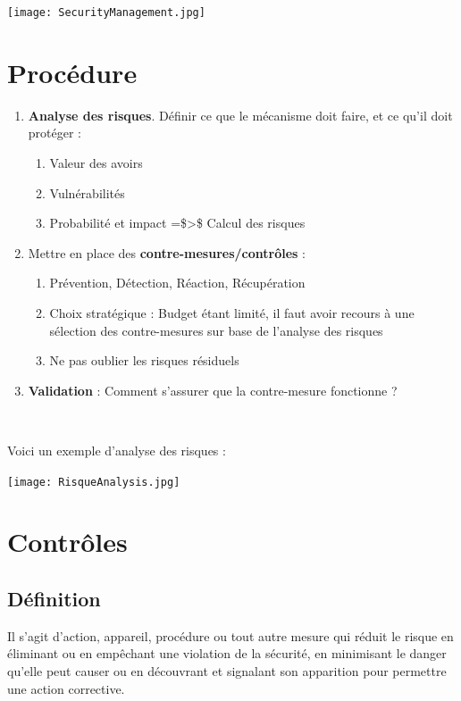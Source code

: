 \documentclass{report}
\begin{document}
\texttt{[image: SecurityManagement.jpg]}

\section{Procédure}

\begin{enumerate}
    \item \textbf{Analyse des risques}. Définir ce que le mécanisme doit faire, et ce qu'il doit protéger :
    \begin{enumerate}
        \item Valeur des avoirs
        \item Vulnérabilités
        \item Probabilité et impact =\$\textgreater\$ Calcul des risques
    \end{enumerate}

    \item Mettre en place des \textbf{contre-mesures/contrôles} :
    \begin{enumerate}
        \item Prévention, Détection, Réaction, Récupération
        \item Choix stratégique : Budget étant limité, il faut avoir recours à une sélection des contre-mesures sur base de l'analyse des risques
        \item Ne pas oublier les risques résiduels
    \end{enumerate}

    \item \textbf{Validation} : Comment s'assurer que la contre-mesure fonctionne ?
\end{enumerate}~

Voici un exemple d'analyse des risques :

\texttt{[image: RisqueAnalysis.jpg]}

\section{Contrôles}

\subsection{Définition}

Il s'agit d'action, appareil, procédure ou tout autre mesure qui réduit le risque en éliminant ou en empêchant une violation de la sécurité, en minimisant le danger qu'elle peut causer ou en découvrant et signalant son apparition pour permettre une action corrective.
\end{document}
